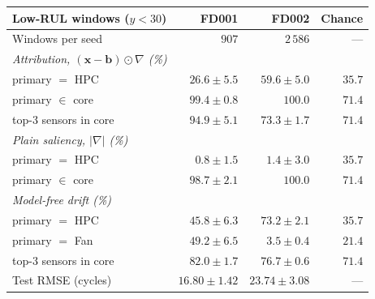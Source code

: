 \begin{tabular}{@{}lrrr@{}}
\toprule
Low-RUL windows ($y<30$) & FD001 & FD002 & Chance \\
\midrule
Windows per seed & $907$ & $2\,586$ & --- \\
\multicolumn{4}{l}{\emph{Attribution, $(\mathbf{x}-\mathbf{b})\odot\nabla$ (\%)}} \\
\quad primary $=$ HPC & $26.6\pm5.5$ & $59.6\pm5.0$ & $35.7$ \\
\quad primary $\in$ core & $99.4\pm0.8$ & $100.0$ & $71.4$ \\
\quad top-3 sensors in core & $94.9\pm5.1$ & $73.3\pm1.7$ & $71.4$ \\
\multicolumn{4}{l}{\emph{Plain saliency, $|\nabla|$ (\%)}} \\
\quad primary $=$ HPC & $0.8\pm1.5$ & $1.4\pm3.0$ & $35.7$ \\
\quad primary $\in$ core & $98.7\pm2.1$ & $100.0$ & $71.4$ \\
\multicolumn{4}{l}{\emph{Model-free drift (\%)}} \\
\quad primary $=$ HPC & $45.8\pm6.3$ & $73.2\pm2.1$ & $35.7$ \\
\quad primary $=$ Fan & $49.2\pm6.5$ & $3.5\pm0.4$ & $21.4$ \\
\quad top-3 sensors in core & $82.0\pm1.7$ & $76.7\pm0.6$ & $71.4$ \\
\midrule
Test RMSE (cycles) & $16.80\pm1.42$ & $23.74\pm3.08$ & --- \\
\bottomrule
\end{tabular}
